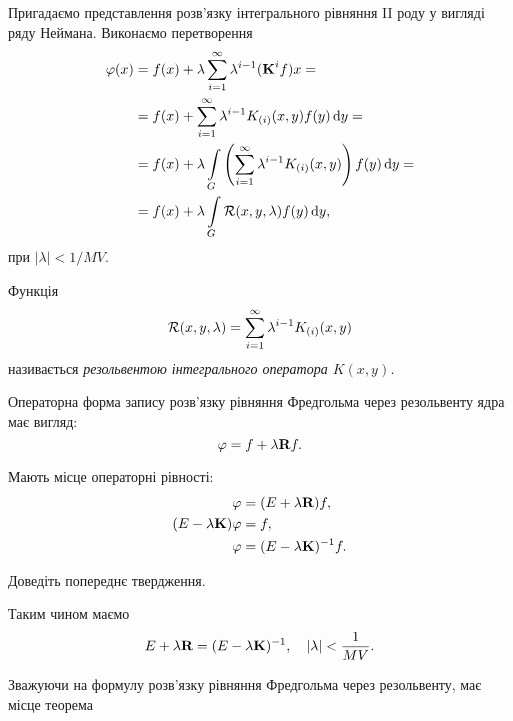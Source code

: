 Пригадаємо представлення розв'язку інтегрального рівняння II роду у вигляді ряду Неймана. Виконаємо перетворення
\begin{equation}
	\begin{aligned}
		\phi(x) &= f(x) + \lambda \Sum_{i = 1}^\infty \lambda^{i - 1} (\bf{K}^i f) x = \\
		&= f(x) + \Sum_{i = 1}^\infty \lambda^{i - 1} K_{(i)} (x, y) f(y) \diff y = \\
		&= f(x) + \lambda \Int_G \left( \Sum_{i = 1}^\infty \lambda^{i - 1} K_{(i)} (x, y) \right) f(y) \diff y = \\
		&= f(x) + \lambda \Int_G \mathcal{R}(x, y, \lambda) f(y) \diff y,
	\end{aligned}
\end{equation}
при $|\lambda| < 1/MV$.

\begin{definition}
	Функція
	\begin{equation}
		\cal{R}(x, y, \lambda) = \Sum_{i = 1}^\infty \lambda^{i - 1} K_{(i)} (x, y)
	\end{equation}
	називається \it{резольвентою} інтегрального оператора $K(x, y)$.
\end{definition}

Операторна форма запису розв'язку рівняння Фредгольма через резольвенту ядра має вигляд:
\begin{equation}
	\phi = f + \lambda \bf{R} f.
\end{equation}

\begin{proposition}
	Мають місце операторні рівності:
	\begin{align}
		\phi &= (E + \lambda \bf{R})f, \\
		(E - \lambda \bf{K})\phi &= f, \\
		\phi &= (E - \lambda \bf{K})^{-1}f.
	\end{align}
\end{proposition}

\begin{exercise}
	Доведіть попереднє твердження.
\end{exercise}

Таким чином маємо
\begin{equation}
	E + \lambda \bf{R} = (E - \lambda \bf{K})^{-1}, \quad |\lambda| < \dfrac{1}{MV}.
\end{equation}

Зважуючи на формулу розв'язку рівняння Фредгольма через резольвенту, має місце теорема

